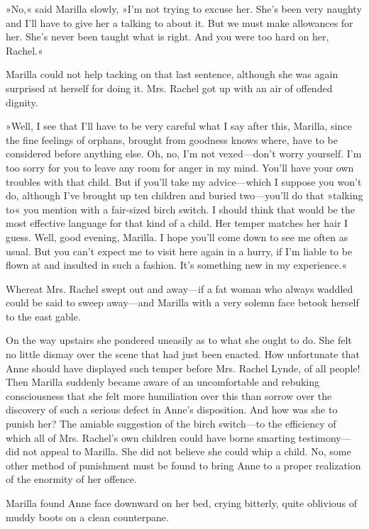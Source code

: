 »No,« said Marilla slowly, »I’m not trying to excuse her. She’s been very naughty and I’ll have to give her a talking to about it. But we must make allowances for her. She’s never been taught what is right. And you were too hard on her, Rachel.«

Marilla could not help tacking on that last sentence, although she was again surprised at herself for doing it. Mrs. Rachel got up with an air of offended dignity.

»Well, I see that I’ll have to be very careful what I say after this, Marilla, since the fine feelings of orphans, brought from goodness knows where, have to be considered before anything else. Oh, no, I’m not vexed—don’t worry yourself. I’m too sorry for you to leave any room for anger in my mind. You’ll have your own troubles with that child. But if you’ll take my advice—which I suppose you won’t do, although I’ve brought up ten children and buried two—you’ll do that »talking to« you mention with a fair-sized birch switch. I should think that would be the most effective language for that kind of a child. Her temper matches her hair I guess. Well, good evening, Marilla. I hope you’ll come down to see me often as usual. But you can’t expect me to visit here again in a hurry, if I’m liable to be flown at and insulted in such a fashion. It’s something new in my experience.«

Whereat Mrs. Rachel swept out and away—if a fat woman who always waddled could be said to sweep away—and Marilla with a very solemn face betook herself to the east gable.

On the way upstairs she pondered uneasily as to what she ought to do. She felt no little dismay over the scene that had just been enacted. How unfortunate that Anne should have displayed such temper before Mrs. Rachel Lynde, of all people! Then Marilla suddenly became aware of an uncomfortable and rebuking consciousness that she felt more humiliation over this than sorrow over the discovery of such a serious defect in Anne’s disposition. And how was she to punish her? The amiable suggestion of the birch switch—to the efficiency of which all of Mrs. Rachel’s own children could have borne smarting testimony—did not appeal to Marilla. She did not believe she could whip a child. No, some other method of punishment must be found to bring Anne to a proper realization of the enormity of her offence.

Marilla found Anne face downward on her bed, crying bitterly, quite oblivious of muddy boots on a clean counterpane.

